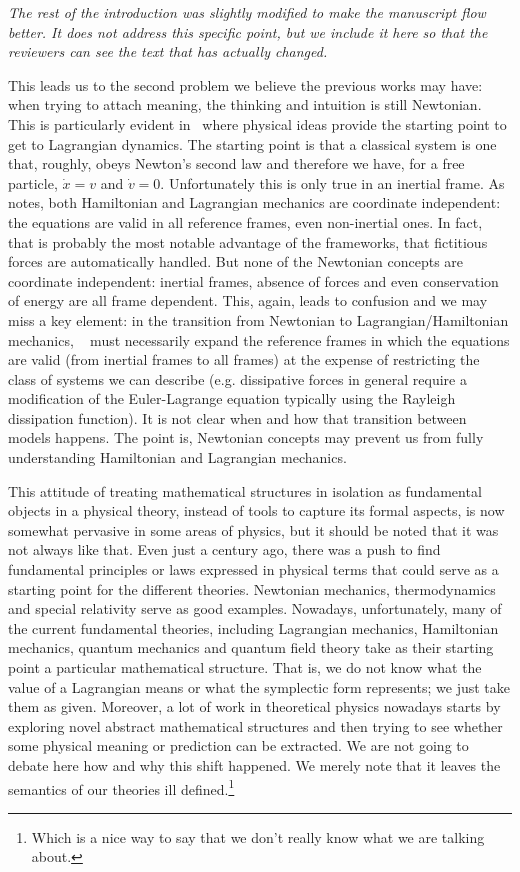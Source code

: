 \documentclass[11pt]{article}
\begin{document}
\emph{The rest of the introduction was slightly modified to make the manuscript flow better. It does not address this specific point, but we include it here so that the reviewers can see the text that has actually changed.}

This leads us to the second problem we believe the previous works may have: when trying to attach meaning, the thinking and intuition is still Newtonian. This is particularly evident in~\cite{Curiel} where physical ideas provide the starting point to get to Lagrangian dynamics. The starting point is that a classical system is one that, roughly, obeys Newton's second law and therefore we have, for a free particle, $\dot{x} = v$ and $\dot{v} = 0$. Unfortunately this is only true in an inertial frame. As~\cite{North} notes, both Hamiltonian and Lagrangian mechanics are coordinate independent: the equations are valid in all reference frames, even non-inertial ones. In fact, that is probably the most notable advantage of the frameworks, that fictitious forces are automatically handled. But none of the Newtonian concepts are coordinate independent: inertial frames, absence of forces and even conservation of energy are all frame dependent. This, again, leads to confusion and we may miss a key element: in the transition from Newtonian to Lagrangian/Hamiltonian mechanics, ~\cite{Curiel} must necessarily expand the reference frames in which the equations are valid (from inertial frames to all frames) at the expense of restricting the class of systems we can describe (e.g. dissipative forces in general require a modification of the Euler-Lagrange equation typically using the Rayleigh dissipation function). It is not clear when and how that transition between models happens. The point is, Newtonian concepts may prevent us from fully understanding Hamiltonian and Lagrangian mechanics.

This attitude of treating mathematical structures in isolation as fundamental objects in a physical theory, instead of tools to capture its formal aspects, is now somewhat pervasive in some areas of physics, but it should be noted that it was not always like that. Even just a century ago, there was a push to find fundamental principles or laws expressed in physical terms that could serve as a starting point for the different theories. Newtonian mechanics, thermodynamics and special relativity serve as good examples. Nowadays, unfortunately, many of the current fundamental theories, including Lagrangian mechanics, Hamiltonian mechanics, quantum mechanics and quantum field theory take as their starting point a particular mathematical structure. That is, we do not know what the value of a Lagrangian means or what the symplectic form represents; we just take them as given. Moreover, a lot of work in theoretical physics nowadays starts by exploring novel abstract mathematical structures and then trying to see whether some physical meaning or prediction can be extracted. We are not going to debate here how and why this shift happened. We merely note that it leaves the semantics of our theories ill defined.\footnote{Which is a nice way to say that we don't really know what we are talking about.} 
\end{document}

